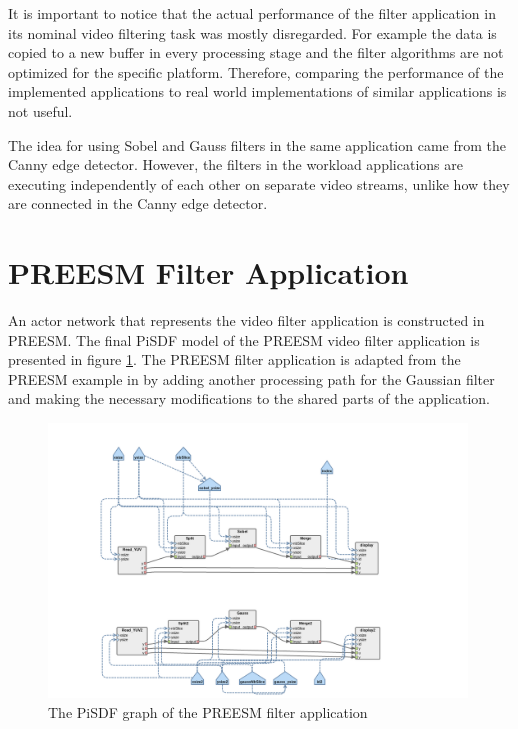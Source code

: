 It is important to notice that the actual performance of the filter application in its nominal video filtering task was mostly disregarded. For example the data is copied to a new buffer in every processing stage and the filter algorithms are not optimized for the specific platform. Therefore, comparing the performance of the implemented applications to real world implementations of similar applications is not useful.

The idea for using Sobel and Gauss filters in the same application came from the Canny edge detector. However, the filters in the workload applications are executing independently of each other on separate video streams, unlike how they are connected in the Canny edge detector.

\section{PREESM Filter Application}
\label{sec:preesmapp}
An actor network that represents the video filter application is constructed in PREESM. The final PiSDF model of the PREESM video filter application is presented in figure \ref{fig:preesm_actors}. The PREESM filter application is adapted from the PREESM example in \cite{preesmtut} by adding another processing path for the Gaussian filter and making the necessary modifications to the shared parts of the application.

\begin{figure}[h!]
    \begin{center}
        \includegraphics[width=0.99\textwidth]{images/preesm_diagram.png}
        \caption{The PiSDF graph of the PREESM filter application}
        \label{fig:preesm_actors}
    \end{center}
\end{figure}

